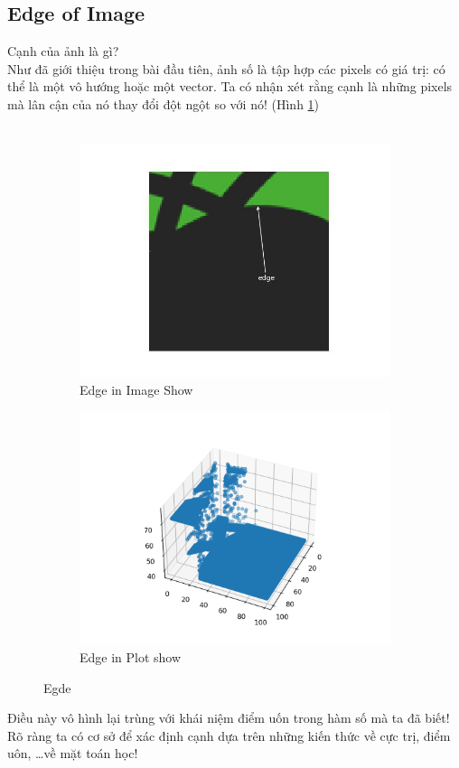 \documentclass{article}
\begin{document}
\subsection{Edge of Image}
Cạnh của ảnh là gì?\\
Như đã giới thiệu trong bài đầu tiên, ảnh số là tập hợp các pixels có giá trị: có thể là một vô hướng hoặc một vector. Ta có nhận xét rằng cạnh là những pixels mà lân cận của nó thay đổi đột ngột so với nó! (Hình \ref{fig2})\\\\
\begin{figure}[ht!]
    \centering
    \begin{subfigure}[b]{0.4\linewidth}
    \includegraphics[width =\linewidth]{cut.jpg}
    \caption{Edge in Image Show}

    \end{subfigure}
    \begin{subfigure}[b]{0.5\linewidth}
    \includegraphics[width = \linewidth]{cut2.png}
    \caption{Edge in Plot show}
    \end{subfigure}
    \caption{Egde}
    \label{fig2}
\end{figure}Điều này vô hình lại trùng với khái niệm điểm uốn trong hàm số mà ta đã biết! Rõ ràng ta có cơ sở để xác định cạnh dựa trên những kiến thức về cực trị, điểm uôn, \ldots về mặt toán học!\\\\
\end{document}
